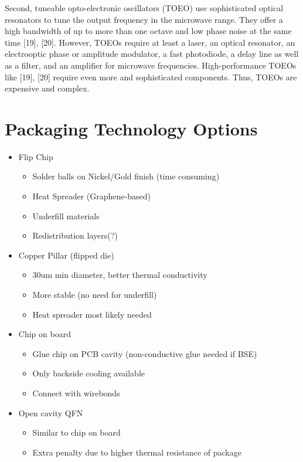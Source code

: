 \documentclass{article}
\begin{document}
\begin{info}
	Second, tuneable opto-electronic oscillators (TOEO) use sophisticated optical resonators to tune the output frequency in the microwave range. They offer a high bandwidth of up to more than one octave and low phase noise at the same time [19], [20]. However, TOEOs require at least a laser, an optical resonator, an electrooptic phase or amplitude modulator, a fast photodiode, a delay line as well as a filter, and an amplifier for microwave frequencies. High-performance TOEOs like [19], [20] require even more and sophisticated components. Thus, TOEOs are expensive and complex.
\end{info}

\section{Packaging Technology Options}

\begin{itemize}
	\item Flip Chip
	\begin{itemize}
		\item Solder balls on Nickel/Gold finish (time consuming) %
		\item Heat Spreader (Graphene-based)
		\item Underfill materials
		\item Redistribution layers(?)
	\end{itemize}
	\item Copper Pillar (flipped die)
	\begin{itemize}
		\item 30um min diameter, better thermal conductivity
		\item More stable (no need for underfill)
		\item Heat spreader most likely needed
	\end{itemize}
	\item Chip on board
	\begin{itemize}
		\item Glue chip on PCB cavity (non-conductive glue needed if BSE)
		\item Only backside cooling available
		\item Connect with wirebonds
	\end{itemize}
	\item Open cavity QFN
	\begin{itemize}
		\item Similar to chip on board
		\item Extra penalty due to higher thermal resistance of package
	\end{itemize}
\end{itemize}
\end{document}
